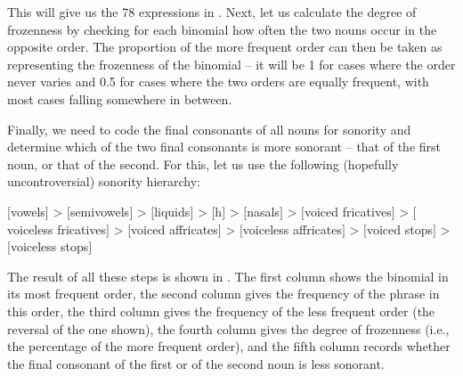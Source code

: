 This will give us the 78 expressions in . Next, let us calculate the degree of frozenness  by checking for each binomial  how often the two nouns  occur in the opposite order. The proportion of the more frequent order can then be taken as representing the frozenness of the binomial  -- it will be 1 for cases where the order never varies and 0.5 for cases where the two orders are equally frequent,  with most cases falling somewhere in between.

Finally, we need to code  the final consonants  of all nouns  for sonority  and determine which of the two final consonants is more sonorant -- that of the first noun, or that of the second. For this, let us use the following (hopefully uncontroversial) sonority  hierarchy:
\begin{exe}
\ex $[$vowels$]$ > $[$semivowels$]$ > $[$liquids$]$ > $[$h$]$ > $[$nasals$]$ > $[$voiced fricatives$]$ > $[$voiceless fricatives$]$ > $[$voiced affricates$]$ > $[$voiceless affricates$]$ > $[$voiced stops$]$ > $[$voiceless stops$]$
\label{ex:sonorityhierarchy}
\end{exe}

The result of all these steps is shown in . The first column shows the binomial  in its most frequent order, the second column gives the frequency  of the phrase in this order, the third column gives the frequency of the less frequent order (the reversal of the one shown), the fourth column gives the degree of frozenness  (i.e., the percentage of the more frequent order), and the fifth column records whether the final consonant  of the first or of the second noun  is less  sonorant.

